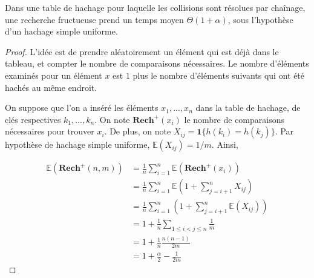 \begin{theorem}
Dans une table de hachage pour laquelle les collisions sont résolues par chaînage, une recherche fructueuse prend un temps moyen $\Theta(1+\alpha)$, sous l'hypothèse d'un hachage simple uniforme.
\end{theorem}

\begin{proof}
L'idée est de prendre aléatoirement un élément qui est déjà dans le tableau, et compter le nombre de comparaisons nécessaires. Le nombre d'éléments examinés pour un élément $x$ est $1$ plus le nombre d'éléments suivants qui ont été hachés au même endroit.

On suppose que l'on a inséré les éléments $x_1,...,x_n$ dans la table de hachage, de clés respectives $k_1,...,k_n$. On note $\mathbf{Rech}^+(x_i)$ le nombre de comparaisons nécessaires pour trouver $x_i$. De plus, on note $X_{ij} = \mathbf{1}\{h(k_i)=h(k_j)\}$. Par hypothèse de hachage simple uniforme, $\mathbb{E}(X_{ij})=1/m$.
Ainsi, 

\begin{align*}
\mathbb{E}(\mathbf{Rech}^+(n,m)) &= \frac{1}{n} \sum_{i=1}^n \mathbb{E}(\mathbf{Rech}^+(x_i)) \\
&= \frac{1}{n} \sum_{i=1}^n \mathbb{E}\left( 1+\sum_{j=i+1}^n X_{ij}\right) \\
&= \frac{1}{n} \sum_{i=1}^n \left( 1+\sum_{j=i+1}^n \mathbb{E}(X_{ij})\right)\\
&= 1+ \frac{1}{n}\sum_{1\leq i <j \leq n}\frac{1}{m} \\
&= 1 + \frac{1}{n}\frac{n(n-1)}{2m} \\
&= 1 + \frac{\alpha}{2}- \frac{1}{2m}
\end{align*}
\end{proof}

